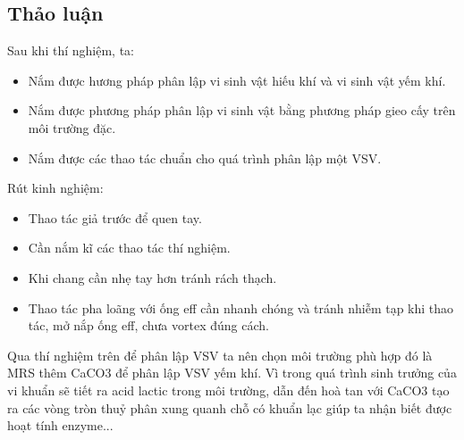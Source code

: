 \subsection{Thảo luận}

Sau khi thí nghiệm, ta:

\begin{itemize}
    \item Nắm được hương pháp phân lập vi sinh vật hiếu khí và vi sinh vật yếm khí.
    \item Nắm được phương pháp phân lập vi sinh vật bằng phương pháp gieo cấy trên môi trường đặc.
    \item Nắm được các thao tác chuẩn cho quá trình phân lập một VSV.
\end{itemize}

Rút kinh nghiệm:

\begin{itemize}
    \item Thao tác giả trước để quen tay.
    \item Cần nắm kĩ các thao tác thí nghiệm.
    \item Khi chang cần nhẹ tay hơn tránh rách thạch.
    \item Thao tác pha loãng với ống eff cần nhanh chóng và tránh nhiễm tạp khi thao tác, mở nắp ống eff, chưa vortex đúng cách.
\end{itemize}

Qua thí nghiệm trên để phân lập VSV ta nên chọn môi trường phù hợp đó là MRS thêm CaCO3 để phân lập VSV yếm khí. Vì trong quá trình sinh trưởng của vi khuẩn sẽ tiết ra acid lactic trong môi trường, dẫn đến hoà tan với CaCO3 tạo ra các vòng tròn thuỷ phân xung quanh chỗ có khuẩn lạc giúp ta nhận biết được hoạt tính enzyme...
